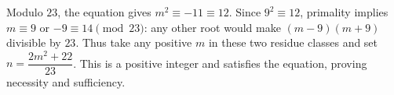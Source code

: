 Modulo $23$, the equation gives $m^2\equiv-11\equiv12$. Since $9^2\equiv12$, primality implies $m\equiv9$ or $-9\equiv14\pmod{23}$: any other root would make $(m-9)(m+9)$ divisible by $23$. Thus take any positive $m$ in these two residue classes and set $\boxed{n=\dfrac{2m^2+22}{23}}$. This is a positive integer and satisfies the equation, proving necessity and sufficiency.
